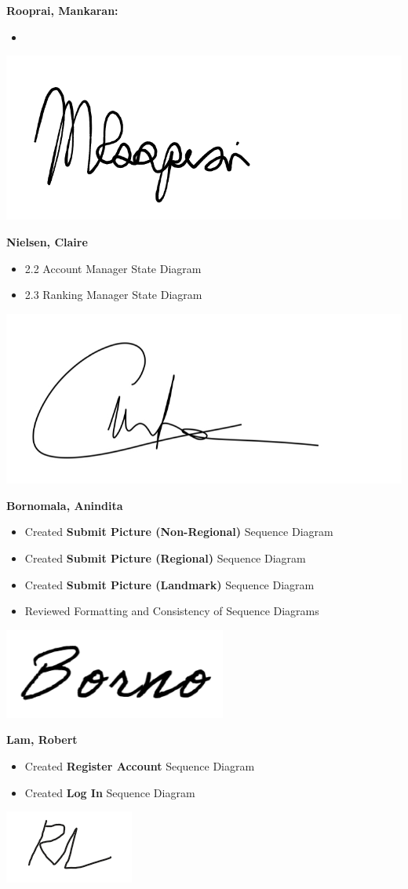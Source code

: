 \documentclass[]{article}
\begin{document}
\textbf{Rooprai, Mankaran:}
\begin{itemize}
    \item
\end{itemize}
\includegraphics[scale=0.15]{mankaransignature.png}

\textbf{Nielsen, Claire}
\begin{itemize}
    \item 2.2 Account Manager State Diagram
    \item 2.3 Ranking Manager State Diagram
\end{itemize}
\includegraphics[scale=0.15]{clairesignature.jpg}

\textbf{Bornomala, Anindita}
\begin{itemize}
    \item Created \textbf{Submit Picture (Non-Regional)} Sequence Diagram
    \item Created \textbf{Submit Picture (Regional)} Sequence Diagram
    \item Created \textbf{Submit Picture (Landmark)} Sequence Diagram
    \item Reviewed Formatting and Consistency of Sequence Diagrams
\end{itemize}
\includegraphics[scale=0.50]{bornosignature.png}

\textbf{Lam, Robert}
\begin{itemize}
    \item Created \textbf{Register Account} Sequence Diagram
    \item Created \textbf{Log In} Sequence Diagram
\end{itemize}
\includegraphics[scale=1]{robertsignature.png}

\end{document}
